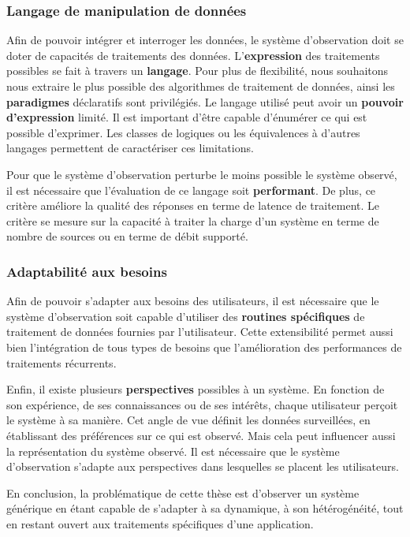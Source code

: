 \subsubsection{Langage de manipulation de données}
Afin de pouvoir intégrer et interroger les données, le système d'observation doit se doter de capacités de traitements des données. L'\textbf{expression} des traitements possibles se fait à travers un \textbf{langage}. Pour plus de flexibilité, nous souhaitons nous extraire le plus possible des algorithmes de traitement de données, ainsi les \textbf{paradigmes} déclaratifs sont privilégiés. Le langage utilisé peut avoir un \textbf{pouvoir d'expression} limité. Il est important d'être capable d'énumérer ce qui est possible d'exprimer. Les classes de logiques ou les équivalences à d'autres langages permettent de caractériser ces limitations.

Pour que le système d'observation perturbe le moins possible le système observé, il est nécessaire que l'évaluation de ce langage soit \textbf{performant}. De plus, ce critère améliore la qualité des réponses en terme de latence de traitement. Le critère se mesure sur la capacité à traiter la charge d'un système en terme de nombre de sources ou en terme de débit supporté.

\subsubsection{Adaptabilité aux besoins}
Afin de pouvoir s'adapter aux besoins des utilisateurs, il est nécessaire que le système d'observation soit capable d'utiliser des \textbf{routines spécifiques} de traitement de données fournies par l'utilisateur. Cette extensibilité permet aussi bien l'intégration de tous types de besoins que l'amélioration des performances de traitements récurrents.

Enfin, il existe plusieurs \textbf{perspectives} possibles à un système. En fonction de son expérience, de ses connaissances ou de ses intérêts, chaque utilisateur perçoit le système à sa manière. Cet angle de vue définit les données surveillées, en établissant des préférences sur ce qui est observé. Mais cela peut influencer aussi la représentation du système observé. Il est nécessaire que le système d'observation s'adapte aux perspectives dans lesquelles se placent les utilisateurs.

En conclusion, la problématique de cette thèse est d'observer un système générique en étant capable de s'adapter à sa dynamique, à son hétérogénéité, tout en restant ouvert aux traitements spécifiques d'une application.